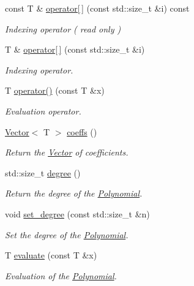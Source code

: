 \begin{DoxyCompactItemize}
const T \& \hyperlink{classLuna_1_1Polynomial_a52e4b5f045715662769eab969fdfa979}{operator\mbox{[}$\,$\mbox{]}} (const std\+::size\+\_\+t \&i) const
\begin{DoxyCompactList}\small\item\em Indexing operator ( read only ) \end{DoxyCompactList}\item 
T \& \hyperlink{classLuna_1_1Polynomial_ae63c47e4aa8a74982a40cd05e032319d}{operator\mbox{[}$\,$\mbox{]}} (const std\+::size\+\_\+t \&i)
\begin{DoxyCompactList}\small\item\em Indexing operator. \end{DoxyCompactList}\item 
T \hyperlink{classLuna_1_1Polynomial_a03016909c173bfd72db4be42923a960a}{operator()} (const T \&x)
\begin{DoxyCompactList}\small\item\em Evaluation operator. \end{DoxyCompactList}\item 
\hyperlink{classLuna_1_1Vector}{Vector}$<$ T $>$ \hyperlink{classLuna_1_1Polynomial_ab5e966c308b7e66d9c1c20666926db34}{coeffs} ()
\begin{DoxyCompactList}\small\item\em Return the \hyperlink{classLuna_1_1Vector}{Vector} of coefficients. \end{DoxyCompactList}\item 
std\+::size\+\_\+t \hyperlink{classLuna_1_1Polynomial_ae5ea66d8b21609ec180ec21c539aa944}{degree} ()
\begin{DoxyCompactList}\small\item\em Return the degree of the \hyperlink{classLuna_1_1Polynomial}{Polynomial}. \end{DoxyCompactList}\item 
void \hyperlink{classLuna_1_1Polynomial_ad1afdd49b8020cc85a51c889b7454889}{set\+\_\+degree} (const std\+::size\+\_\+t \&n)
\begin{DoxyCompactList}\small\item\em Set the degree of the \hyperlink{classLuna_1_1Polynomial}{Polynomial}. \end{DoxyCompactList}\item 
T \hyperlink{classLuna_1_1Polynomial_aee740c1957530475bb4a9956f06864e4}{evaluate} (const T \&x)
\begin{DoxyCompactList}\small\item\em Evaluation of the \hyperlink{classLuna_1_1Polynomial}{Polynomial}. \end{DoxyCompactList}\item 

\end{DoxyCompactItemize}
